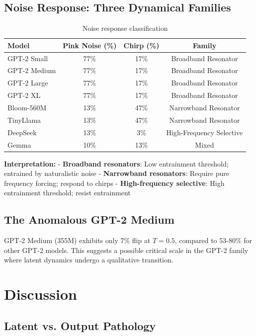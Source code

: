 \documentclass{article}
\begin{document}
\subsection{Noise Response: Three Dynamical Families}

\begin{table}[H]
\centering
\caption{Noise response classification}
\label{tab:noise}
\begin{tabular}{lccc}
\toprule
Model & Pink Noise (\%) & Chirp (\%) & Family \\
\midrule
GPT-2 Small & 77\% & 17\% & Broadband Resonator \\
GPT-2 Medium & 77\% & 17\% & Broadband Resonator \\
GPT-2 Large & 77\% & 17\% & Broadband Resonator \\
GPT-2 XL & 77\% & 17\% & Broadband Resonator \\
Bloom-560M & 13\% & 47\% & Narrowband Resonator \\
TinyLlama & 13\% & 47\% & Narrowband Resonator \\
DeepSeek & 13\% & 3\% & High-Frequency Selective \\
Gemma & 10\% & 13\% & Mixed \\
\bottomrule
\end{tabular}
\end{table}

\textbf{Interpretation:}
- \textbf{Broadband resonators}: Low entrainment threshold; entrained by naturalistic noise
- \textbf{Narrowband resonators}: Require pure frequency forcing; respond to chirps
- \textbf{High-frequency selective}: High entrainment threshold; resist entrainment

\subsection{The Anomalous GPT-2 Medium}

GPT-2 Medium (355M) exhibits only 7\% flip at $T=0.5$, compared to 53-80\% for other GPT-2 models. This suggests a possible critical scale in the GPT-2 family where latent dynamics undergo a qualitative transition.

\section{Discussion}

\subsection{Latent vs. Output Pathology}
\end{document}
